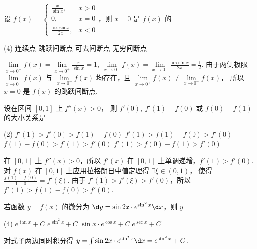 \begin{problem}
  设 $f(x) =
  \begin{cases}
    \frac{x}{\sin x},     & x > 0\\
    0,                    & x = 0\\
    \frac{\arcsin x}{2x}, & x < 0
  \end{cases}$，则 $x = 0$ 是 $f(x)$ 的
  \begin{tasks}(4)
    \task 连续点
    \task[\true] 跳跃间断点
    \task 可去间断点
    \task 无穷间断点
  \end{tasks}
\end{problem}
\begin{solution}
  $ \lim\limits_{x \to 0^+} f(x)
  = \lim\limits_{x \to 0^+} \frac{x}{\sin x} = 1,~
    \lim\limits_{x \to 0^-} f(x)
  = \lim\limits_{x \to 0^-} \frac{\arcsin x}{2x} = \frac12$.
  由于两侧极限 $\lim\limits_{x \to 0^+} f(x)$ 与 $\lim\limits_{x \to 0^-} f(x)$
  均存在，且 $\lim\limits_{x \to 0^+} f(x) \neq \lim\limits_{x \to 0^-} f(x)$，
  所以 $x = 0$ 是 $f(x)$ 的跳跃间断点.
\end{solution}

\begin{problem}
  设在区间 $[0,1]$ 上 $f''(x) > 0$，
  则 $f'(0),~ f'(1) - f(0)$ 或 $f(0) - f(1)$ 的大小关系是
  \begin{tasks}(2)
    \task $f'(1) > f'(0) > f(1) - f(0)$
    \task[\true] $f'(1) > f(1) - f(0) > f'(0)$
    \task $f(1) - f(0) > f'(1) > f'(0)$
    \task $f'(1) > f(0) - f(1) > f'(0)$
  \end{tasks}
\end{problem}
\begin{solution}
  在 $[0,1]$ 上 $f''(x) > 0$，所以 $f'(x)$ 在 $[0,1]$ 上单调递增，$f'(1) > f'(0)$.
  对 $f(x)$ 在 $[0,1]$ 上应用拉格朗日中值定理得 $\exists \xi \in (0,1)$，
  使得 $\frac{f(1) - f(0)}{1 - 0} = f'(\xi)$.
  由于 $f'(1) > f'(\xi) > f'(0)$，所以 $f'(1) > f(1) - f(0) > f'(0)$.
\end{solution}

\begin{problem}
  若函数 $y = f(x)$ 的微分为 $\d y = \sin 2x \cdot e^{\sin^2 x} \d x$，则 $y = $
  \begin{tasks}(4)
    \task $e^{\tan x} + C$
    \task[\true] $e^{\sin^2x} + C$
    \task $\sin x \cdot e^{\cos x} + C$
    \task $e^{\sec x} + C$
  \end{tasks}
\end{problem}
\begin{solution}
  对式子两边同时积分得
  $y = \int \sin 2x \cdot e^{\sin^2x} \d x = e^{\sin^2x} + C$.
\end{solution}

